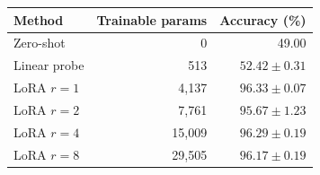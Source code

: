 \begin{tabular}{lrr}\toprule
Method & Trainable params & Accuracy (\%) \\\midrule
Zero-shot & 0 & 49.00 \\
Linear probe & 513 & $52.42\pm0.31$ \\
LoRA $r=1$ & 4,137 & $96.33\pm0.07$ \\
LoRA $r=2$ & 7,761 & $95.67\pm1.23$ \\
LoRA $r=4$ & 15,009 & $96.29\pm0.19$ \\
LoRA $r=8$ & 29,505 & $96.17\pm0.19$ \\
\bottomrule
\end{tabular}
